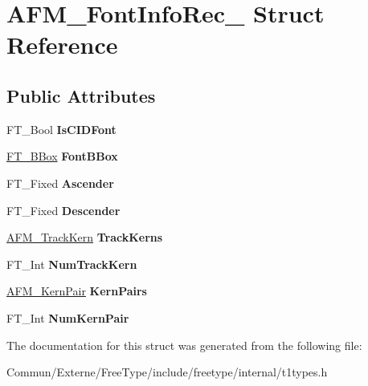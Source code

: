 \hypertarget{struct_a_f_m___font_info_rec__}{}\section{A\+F\+M\+\_\+\+Font\+Info\+Rec\+\_\+ Struct Reference}
\label{struct_a_f_m___font_info_rec__}
\subsection*{Public Attributes}
\begin{DoxyCompactItemize}
\item 
F\+T\+\_\+\+Bool {\bfseries Is\+C\+I\+D\+Font}\hypertarget{struct_a_f_m___font_info_rec___a6f198e74da5d8a3b7ff7518e255be231}{}\label{struct_a_f_m___font_info_rec___a6f198e74da5d8a3b7ff7518e255be231}

\item 
\hyperlink{struct_f_t___b_box__}{F\+T\+\_\+\+B\+Box} {\bfseries Font\+B\+Box}\hypertarget{struct_a_f_m___font_info_rec___afa5112d6b0cc51839889206012dc1be6}{}\label{struct_a_f_m___font_info_rec___afa5112d6b0cc51839889206012dc1be6}

\item 
F\+T\+\_\+\+Fixed {\bfseries Ascender}\hypertarget{struct_a_f_m___font_info_rec___a0b80412562435a2198a71aa4188ee85b}{}\label{struct_a_f_m___font_info_rec___a0b80412562435a2198a71aa4188ee85b}

\item 
F\+T\+\_\+\+Fixed {\bfseries Descender}\hypertarget{struct_a_f_m___font_info_rec___a3561507200f0bc3413988af920924053}{}\label{struct_a_f_m___font_info_rec___a3561507200f0bc3413988af920924053}

\item 
\hyperlink{struct_a_f_m___track_kern_rec__}{A\+F\+M\+\_\+\+Track\+Kern} {\bfseries Track\+Kerns}\hypertarget{struct_a_f_m___font_info_rec___a8d9305229a1dacc15b8fceb5dbf25b9d}{}\label{struct_a_f_m___font_info_rec___a8d9305229a1dacc15b8fceb5dbf25b9d}

\item 
F\+T\+\_\+\+Int {\bfseries Num\+Track\+Kern}\hypertarget{struct_a_f_m___font_info_rec___a08a9207e8d4b0dd9dc0313218462f00e}{}\label{struct_a_f_m___font_info_rec___a08a9207e8d4b0dd9dc0313218462f00e}

\item 
\hyperlink{struct_a_f_m___kern_pair_rec__}{A\+F\+M\+\_\+\+Kern\+Pair} {\bfseries Kern\+Pairs}\hypertarget{struct_a_f_m___font_info_rec___a16c5da5249d4d4f68cc169469f3ee75a}{}\label{struct_a_f_m___font_info_rec___a16c5da5249d4d4f68cc169469f3ee75a}

\item 
F\+T\+\_\+\+Int {\bfseries Num\+Kern\+Pair}\hypertarget{struct_a_f_m___font_info_rec___a8ff8af3c83fbf0b060bb711b57f1affd}{}\label{struct_a_f_m___font_info_rec___a8ff8af3c83fbf0b060bb711b57f1affd}

\end{DoxyCompactItemize}


The documentation for this struct was generated from the following file\+:\begin{DoxyCompactItemize}
\item 
Commun/\+Externe/\+Free\+Type/include/freetype/internal/t1types.\+h\end{DoxyCompactItemize}
